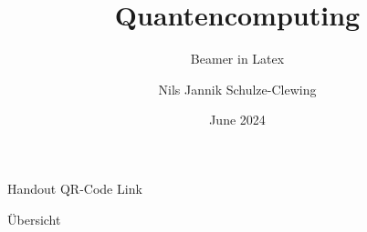 \documentclass{beamer}
\title{Quantencomputing}
\subtitle{Beamer in Latex}
\author{Nils Jannik Schulze-Clewing}
\institute{THM}
\date{June 2024}
\begin{document}
\begin{frame}
  \titlepage  
\end{frame}

\begin{frame}{Handout}
QR-Code
Link
\end{frame}

\begin{frame}{Übersicht}
\tableofcontents

\end{frame}
\end{document}
